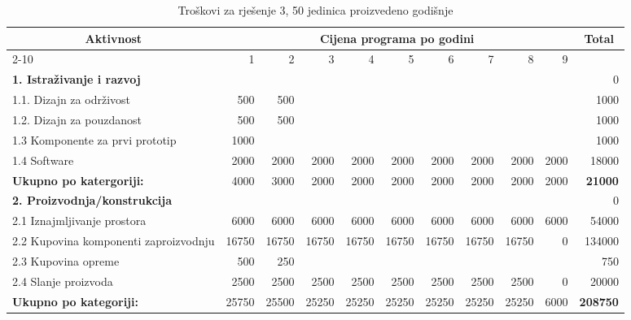 \documentclass[12pt]{article}
\begin{document}
\begin{landscape}
\begin{table}[htbp]
  \centering
  \small
  \caption{Troškovi za rješenje 3, 50 jedinica proizvedeno godišnje}
    \begin{tabular}{lrrrrrrrrrr}
    \toprule
    \multicolumn{1}{c}{\multirow{2}[4]{*}{Aktivnost}} & \multicolumn{9}{c}{Cijena programa po godini}                         & \multicolumn{1}{c}{\multirow{2}[4]{*}{Total}} \\
\cmidrule{2-10}          & 1     & 2     & 3     & 4     & 5     & 6     & 7     & 8     & 9     &  \\
    \midrule
    \textbf{1. Istraživanje i razvoj} &       &       &       &       &       &       &       &       &       & 0 \\
    1.1. Dizajn za održivost & 500   & 500   &       &       &       &       &       &       &       & 1000 \\
    1.2. Dizajn za pouzdanost & 500   & 500   &       &       &       &       &       &       &       & 1000 \\
    1.3 Komponente za prvi prototip & 1000  &       &       &       &       &       &       &       &       & 1000 \\
    1.4 Software & 2000  & 2000  & 2000  & 2000  & 2000  & 2000  & 2000  & 2000  & 2000  & 18000 \\
    \midrule
    \textbf{Ukupno po katergoriji:} & 4000  & 3000  & 2000  & 2000  & 2000  & 2000  & 2000  & 2000  & 2000  & \textbf{21000} \\
    \midrule
    \textbf{2. Proizvodnja/konstrukcija} &       &       &       &       &       &       &       &       &       & 0 \\
    2.1 Iznajmljivanje prostora & 6000  & 6000  & 6000  & 6000  & 6000  & 6000  & 6000  & 6000  & 6000  & 54000 \\
    \multicolumn{1}{p{14.715em}}{2.2 Kupovina komponenti za\newline{}proizvodnju} & 16750 & 16750 & 16750 & 16750 & 16750 & 16750 & 16750 & 16750 & 0     & 134000 \\
    2.3 Kupovina opreme & 500   & 250   &       &       &       &       &       &       &       & 750 \\
    2.4 Slanje proizvoda & 2500  & 2500  & 2500  & 2500  & 2500  & 2500  & 2500  & 2500  & 0     & 20000 \\
    \midrule
    \textbf{Ukupno po kategoriji:} & 25750 & 25500 & 25250 & 25250 & 25250 & 25250 & 25250 & 25250 & 6000  & \textbf{208750} \\

\end{tabular}
\end{table}
\end{landscape}
\end{document}
